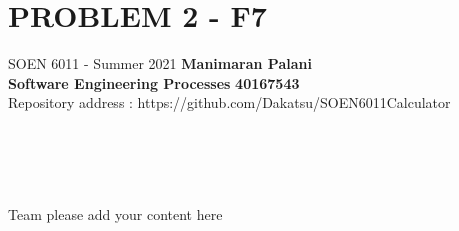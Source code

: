 \documentclass[a4paper, 11pt]{report}
\begin{document}
\section*{PROBLEM 2 - F7}
\normalsize {SOEN 6011 - Summer 2021} \hfill \textbf{Manimaran Palani} \\
\textbf{ Software Engineering Processes}  \hfill \textbf{40167543} \\
\hfill Repository address : https://github.com/Dakatsu/SOEN6011Calculator
\\\\\\\\\\
 \begin{center} Team please add your content here \end{center}
\end{document}
